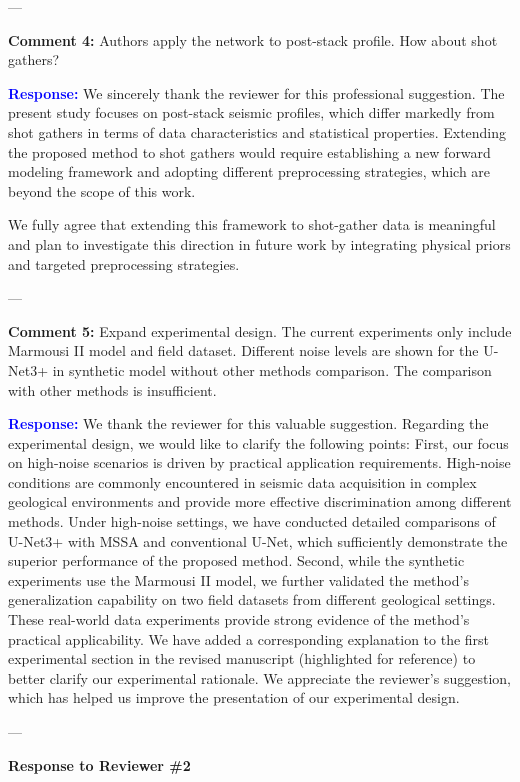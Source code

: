 \documentclass[12pt]{article}
\begin{document}
---

\textbf{Comment 4:}  
Authors apply the network to post-stack profile. How about shot gathers?

\textcolor{blue}{\textbf{Response:}}  
We sincerely thank the reviewer for this professional suggestion. The present study focuses on post-stack seismic profiles, which differ markedly from shot gathers in terms of data characteristics and statistical properties. Extending the proposed method to shot gathers would require establishing a new forward modeling framework and adopting different preprocessing strategies, which are beyond the scope of this work. 

We fully agree that extending this framework to shot-gather data is meaningful and plan to investigate this direction in future work by integrating physical priors and targeted preprocessing strategies.

---

\textbf{Comment 5:}  
Expand experimental design. The current experiments only include Marmousi II model and field dataset. Different noise levels are shown for the U-Net3+ in synthetic model without other methods comparison. The comparison with other methods is insufficient.

\textcolor{blue}{\textbf{Response:}}  
We thank the reviewer for this valuable suggestion. Regarding the experimental design, we would like to clarify the following points:
First, our focus on high-noise scenarios is driven by practical application requirements. High-noise conditions are commonly encountered in seismic data acquisition in complex geological environments and provide more effective discrimination among different methods. Under high-noise settings, we have conducted detailed comparisons of U-Net3+ with MSSA and conventional U-Net, which sufficiently demonstrate the superior performance of the proposed method.
Second, while the synthetic experiments use the Marmousi II model, we further validated the method's generalization capability on two field datasets from different geological settings. These real-world data experiments provide strong evidence of the method's practical applicability.
We have added a corresponding explanation to the first experimental section in the revised manuscript (highlighted for reference) to better clarify our experimental rationale. We appreciate the reviewer's suggestion, which has helped us improve the presentation of our experimental design.

---

\bigskip
\textbf{Response to Reviewer \#2}
\end{document}
